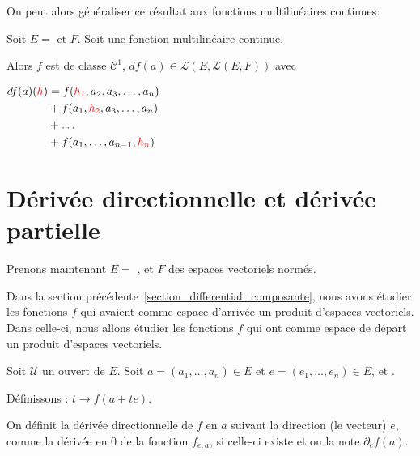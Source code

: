 On peut alors généraliser ce résultat aux fonctions multilinéaires continues:

\begin{proposition}
\label{multilinear_differential_application}
	Soit $E = $  et $F$.
	Soit  une fonction multilinéaire continue.

	Alors $f$ est de classe $\mathcal{C}^{1}$, 
	$df(a) \in \mathcal{L}(E, \mathcal{L}(E, F))$ avec 
	
	$
	\begin{aligned}
		df(a)(\textcolor{red}{h}) 
	&=	f(\textcolor{red}{h_{1}}, a_{2}, a_{3}, \ldots, a_{n}) \\
	&+	f(a_{1}, \textcolor{red}{h_{2}}, a_{3}, \ldots, a_{n}) \\
	&+	\ldots \\
	&+	f(a_{1}, \ldots, a_{n-1}, \textcolor{red}{h_{n}})
	\end{aligned}
	$
\end{proposition}
\section{Dérivée directionnelle et dérivée partielle}
\label{section_directionnal_partial_derivative}

Prenons maintenant $E = $ , et $F$ des espaces vectoriels
normés.

Dans la section précédente~\ref{section_differential_composante}, nous avons
étudier les fonctions $f$ qui avaient comme espace d'arrivée un produit d'espaces
vectoriels. Dans celle-ci, nous allons étudier les fonctions $f$ qui ont comme
espace de départ un produit d'espaces vectoriels.


\begin{definition}
\label{directionnal_application_definition}
	Soit $\mathcal{U}$ un ouvert de $E$.
	Soit $a = (a_{1}, \ldots, a_{n}) \in E$ et $e = (e_{1}, \ldots, e_{n}) \in E$,
	et .

	Définissons : $t \rightarrow f(a + te)$.

	On définit la dérivée directionnelle de $f$ en $a$ suivant la direction (le
	vecteur) $e$, comme la dérivée en $0$ de la fonction $f_{e, a}$, si celle-ci
	existe et on la note ${\partial_{e} f}(a)$.

\end{definition}

